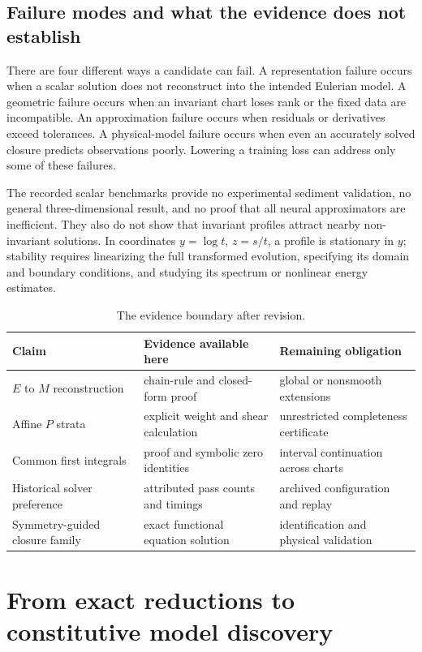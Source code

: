 \documentclass[11pt,a4paper,oneside]{report}
\numberwithin{equation}{chapter}
\begin{document}
\section{Failure modes and what the evidence does not establish}
There are four different ways a candidate can fail. A representation failure occurs when a scalar solution does not reconstruct into the intended Eulerian model. A geometric failure occurs when an invariant chart loses rank or the fixed data are incompatible. An approximation failure occurs when residuals or derivatives exceed tolerances. A physical-model failure occurs when even an accurately solved closure predicts observations poorly. Lowering a training loss can address only some of these failures.

The recorded scalar benchmarks provide no experimental sediment validation, no general three-dimensional result, and no proof that all neural approximators are inefficient. They also do not show that invariant profiles attract nearby non-invariant solutions. In coordinates $y=\log t$, $z=s/t$, a profile is stationary in $y$; stability requires linearizing the full transformed evolution, specifying its domain and boundary conditions, and studying its spectrum or nonlinear energy estimates.

\begin{table}[htbp]\centering\small
\begin{tabularx}{\textwidth}{@{}p{}XX@{}}\toprule
Claim & Evidence available here & Remaining obligation\\\midrule
$E$ to $M$ reconstruction & chain-rule and closed-form proof & global or nonsmooth extensions\\
Affine $P$ strata & explicit weight and shear calculation & unrestricted completeness certificate\\
Common first integrals & proof and symbolic zero identities & interval continuation across charts\\
Historical solver preference & attributed pass counts and timings & archived configuration and replay\\
Symmetry-guided closure family & exact functional equation solution & identification and physical validation\\\bottomrule
\end{tabularx}
\caption{The evidence boundary after revision.}\label{tab:ledger}
\end{table}

\chapter{From exact reductions to constitutive model discovery}\label{ch:outlook}
\end{document}
